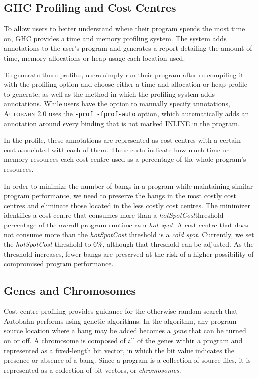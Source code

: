 \documentclass[format=sigplan, review=true]{acmart}
\newcommand{\hotspot}[0]{hot spot}
\newcommand{\coldspot}[0]{cold spot}
\newcommand{\hotspotcost}[0]{\textit{hotSpotCost}}
\newcommand{\At}[0]{\textsc{Autobahn 2.0}}
\begin{document}
\subsection{GHC Profiling and Cost Centres}
To allow users to better understand where their program spends 
the most time on, GHC provides a time and memory profiling system. The
system adds annotations to the user's program and generates a report
detailing the amount of time, memory allocations or heap usage each 
location used. 

To generate these profiles, users simply run their program 
after re-compiling it with the profiling option and choose either a time and allocation or heap profile to generate, as well as the method in which the profiling 
system adds annotations. While users have the option to manually specify
annotations, \At{} uses the \texttt{-prof -fprof-auto} option, which
automatically adds an annotation around every binding that is not marked
INLINE in the program.

In the profile, these annotations are represented as cost centres with a 
certain cost associated with each of them. These costs indicate how much
time or memory resources each cost centre used as a percentage of the
whole program's resources. 

In order to minimize the number of bangs in 
a program while maintaining similar program performance, we need to 
preserve the bangs in the most costly cost centres and eliminate those 
located in the less costly cost centres. The minimizer identifies a cost centre that consumes more than a \hotspotcost{}threshold percentage of the overall program runtime as a \textit{\hotspot{}}. A cost centre that does not consume more than the \hotspotcost{} threshold is a \textit{\coldspot{}}. Currently, we set the \hotspotcost{} threshold to 6\%, although that threshold can be
adjusted. As the threshold increases, fewer bangs
are preserved at the risk of a higher possibility of compromised program 
performance. 

\subsection{Genes and Chromosomes}

Cost centre profiling provides guidance for the otherwise random search 
that Autobahn performs using genetic algorithms. In the algorithm, any 
program source location where a bang may be added becomes a \textit{gene} that can 
be turned on or off. A chromosome is composed of all of the genes within a 
program and represented as a fixed-length bit vector, in which the bit value 
indicates the presence or absence of a bang. Since a program is a collection of source files, it is represented as a collection of bit vectors, or \textit{chromosomes}.
\end{document}
